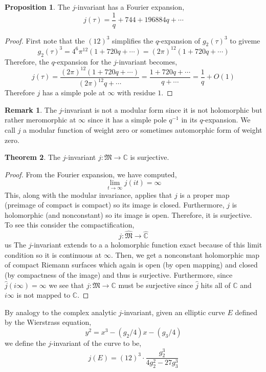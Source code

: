 \documentclass{article}
\newcommand{\C}{\mathbb{C}}
\theoremstyle{definition}
\newtheorem{theorem}{Theorem}[section]
\newtheorem{proposition}[theorem]{Proposition}
\newtheorem{remark}{Remark}[section]
\newenvironment{definition}[1][Definition:]{\begin{trivlist}
\item[\hskip \labelsep {\bfseries #1}]}{\end{trivlist}}
\begin{document}
\begin{proposition}
The $j$-invariant has a Fourier expansion,
\[ j(\tau) = \frac{1}{q} + 744 + 196884 q + \cdots \]
\end{proposition}

\begin{proof}
First note that the $(12)^3$ simplifies the $q$-expansion of $g_2(\tau)^3$ to giveme
\[ g_2(\tau)^3 = 4^6 \pi^{12} (1 + 720 q + \cdots) = (2 \pi)^{12} (1 + 720 q + \cdots) \]
Therefore, the $q$-expansion for the $j$-invariant becomes,
\[ j(\tau) = \frac{(2 \pi)^{12} (1 + 720 q + \cdots )}{(2 \pi)^{12} q + \cdots} = \frac{1 + 720 q + \cdots}{q + \cdots} = \frac{1}{q} + O(1) \]
Therefore $j$ has a simple pole at $\infty$ with residue $1$. 
\end{proof}

\begin{remark}
The $j$-invariant is not a modular form since it is not holomorphic but rather meromorphic at $\infty$ since it has a simple pole $q^{-1}$ in its $q$-expansion. We call $j$ a modular function of weight zero or sometimes automorphic form of weight zero. 
\end{remark}

\begin{theorem}
The $j$-invariant $j : \mathfrak{M} \to \C$ is surjective.
\end{theorem}

\begin{proof}
From the Fourier expansion, we have computed,
\[ \lim_{t \to \infty} j(i t) = \infty \]
This, along with the modular invariance, applies that $j$ is a proper map (preimage of compact is compact) so its image is closed. Furthermore, $j$ is holomorphic (and nonconstant) so its image is open. Therefore, it is surjective. To see this consider the compactification,
\[ \hat{j} : \hat{\mathfrak{M}} \to \hat{\C} \]us 
The $j$-invariant extends to a a holomorphic function exact because of this limit condition so it is continuous at $\infty$. Then, we get a nonconstant holomorphic map of compact Riemann surfaces which again is open (by open mapping) and closed (by compactness of the image) and thus is surjective. Furthermore, since $\hat{j}(i \infty) = \infty$ we see that $j : \mathfrak{M} \to \C$ must be surjective since $\hat{j}$ hits all of $\C$ and $i \infty$ is not mapped to $\C$.
\end{proof}



\begin{definition}
By analogy to the complex analytic $j$-invariant, given an elliptic curve $E$ defined by the Wierstrass equation,
\[ y^2 = x^3 - (g_2/4) x - (g_3/4) \]
we define the $j$-invariant of the curve to be,
\[ j(E) = (12)^3 \cdot \frac{g_2^3}{4 g_2^2 - 27 g_3^3} \]
\end{definition}
\end{document}
